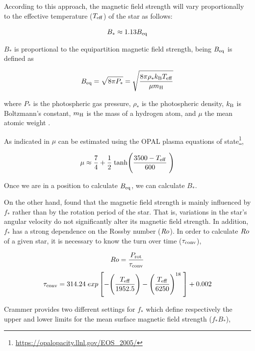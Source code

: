 \documentclass[fleqn,usenatbib]{mnras}
\begin{document}
According to this approach, the magnetic field strength will vary proportionally to the effective temperature ($T_{\mathrm{eff}}$) of the star as follows: 
\begin{ceqn}
\begin{equation}
    B_* \approx 1.13 B_{\mathrm{eq}} \label{eq:mf_bstar}
\end{equation}
\end{ceqn}
$B_*$ is proportional to the equipartition magnetic field strength, being $B_{\mathrm{eq}}$ is defined as 
\begin{ceqn}
\begin{equation}
    B_{\mathrm{eq}} = \sqrt{8\pi P_*} = \sqrt{\frac{8\pi\rho_* k_{\mathrm{B}} T_{\mathrm{eff}}}{\mu m_{\mathrm{H}}}}\label{eq:mf_beq}    
\end{equation}
\end{ceqn}
where $P_*$ is the photospheric gas pressure, $\rho_*$ is the photospheric density, $k_{\mathrm{B}}$ is Boltzmann's constant, $m_{\mathrm{H}}$ is the mass of a hydrogen atom, and $\mu$ the mean atomic weight \citep{Cranmer2011}.

As indicated in \cite{Cranmer2011} $\mu$ can be estimated using the OPAL plasma equations of state\footnote{\url{https://opalopacity.llnl.gov/EOS_2005/}},
\begin{ceqn}
\begin{equation}
    \mu \approx \frac{7}{4} + \frac{1}{2} \; {\rm tanh}\Bigg(\frac{3500-T_{\mathrm{eff}}}{600}\;\Bigg) \label{eq:mf_atom_weight}
\end{equation}
\end{ceqn}
Once we are in a position to calculate $B_{\mathrm{eq}}$, we can calculate $B_*$.\par

On the other hand, \cite{Cranmer2011} found that the magnetic field strength is mainly influenced by $f_*$ rather than by the rotation period of the star. That is, variations in the star's angular velocity do not significantly alter its magnetic field strength. In addition, $f_*$ has a strong dependence on the Rossby number ($Ro$). In order to calculate $Ro$ of a given star, it is necessary to know the turn over time ($\tau_{\mathrm{conv}}$),
\begin{ceqn}
\begin{equation}
    Ro = \frac{P_{\mathrm{rot}}}{\tau_{\mathrm{conv}}} \label{eq:mf_rossby}
\end{equation}
\begin{equation}
    \tau_{\mathrm{conv}} = 314.24\;exp\left[-\Bigg(\frac{T_{\mathrm{eff}}}{1952.5}\Bigg)-\Bigg(\frac{T_{\mathrm{eff}}}{6250}\Bigg)^{18} \;\right]+0.002 \label{eq:mf_turnover}
\end{equation}
\end{ceqn}
\cite{Cranmer2011} Crammer provides two different settings for $f_*$ which define respectively the upper and lower limits for the mean surface magnetic field strength ($f_*B_*$),
\end{document}
